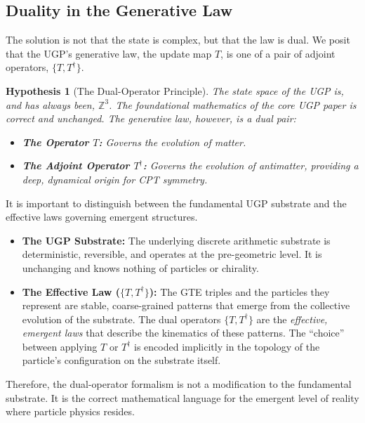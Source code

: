 \documentclass[11pt]{article}
\newtheorem{hypothesis}[theorem]{Hypothesis}
\theoremstyle{remark}
\begin{document}
\subsection{Duality in the Generative Law}
The solution is not that the state is complex, but that the law is dual. We posit that the UGP's generative law, the update map $T$, is one of a pair of adjoint operators, $\{T, T^\dagger\}$.

\begin{hypothesis}[The Dual-Operator Principle]
The state space of the UGP is, and has always been, $\mathbb{Z}^3$. The foundational mathematics of the core UGP paper is correct and unchanged. The generative law, however, is a dual pair:
\begin{itemize}
    \item \textbf{The Operator $T$:} Governs the evolution of matter.
    \item \textbf{The Adjoint Operator $T^\dagger$:} Governs the evolution of antimatter, providing a deep, dynamical origin for CPT symmetry.
\end{itemize}
\end{hypothesis}

\begin{tcolorbox}[colback=blue!5!white,colframe=blue!75!black,title=A Note on Emergence: Substrate vs.\ Effective Dynamics]
It is important to distinguish between the fundamental UGP substrate and the effective laws governing emergent structures.
\begin{itemize}[leftmargin=*]
    \item \textbf{The UGP Substrate:} The underlying discrete arithmetic substrate is deterministic, reversible, and operates at the pre-geometric level. It is unchanging and knows nothing of particles or chirality.
    \item \textbf{The Effective Law ($\{T, T^\dagger\}$):} The GTE triples and the particles they represent are stable, coarse-grained patterns that emerge from the collective evolution of the substrate. The dual operators $\{T, T^\dagger\}$ are the \textit{effective, emergent laws} that describe the kinematics of these patterns. The ``choice'' between applying $T$ or $T^\dagger$ is encoded implicitly in the topology of the particle's configuration on the substrate itself.
\end{itemize}
Therefore, the dual-operator formalism is not a modification to the fundamental substrate. It is the correct mathematical language for the emergent level of reality where particle physics resides.
\end{tcolorbox}
\end{document}
